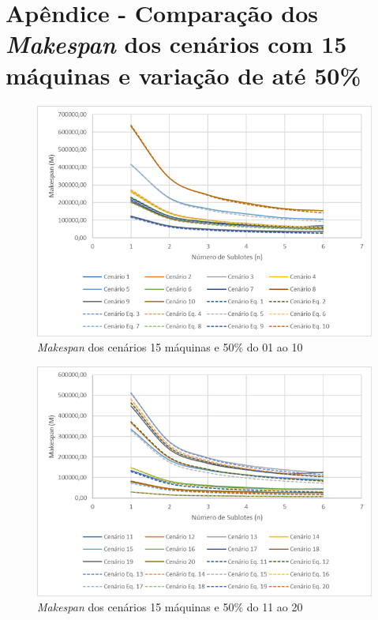 \newpage
\section{Apêndice - Comparação dos \textit{Makespan} dos cenários com 15 máquinas e variação de até 50\%}\label{app:fig15machine50}

\begin{figure}[H]
    \centering
     \includegraphics[width=13cm]{Apendices/Figuras/15m50_01-10.png}
     \caption{\textit{Makespan} dos cenários 15 máquinas e 50\% do 01 ao 10}
    \label{fig:15m50_01-10}
\end{figure}

\begin{figure}[H]
    \centering
     \includegraphics[width=13cm]{Apendices/Figuras/15m50_11-20.png}
     \caption{\textit{Makespan} dos cenários 15 máquinas e 50\% do 11 ao 20}
    \label{fig:15m50_11-20}
\end{figure}

